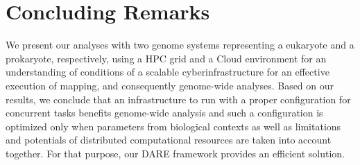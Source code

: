 \documentclass[12pt]{article}
\begin{document}
\section{Concluding Remarks}
We present our analyses with two genome systems representing a eukaryote and a prokaryote, respectively, using
 a HPC grid and a Cloud environment for an understanding of conditions of a scalable cyberinfrastructure for an effective execution of
 mapping, and consequently genome-wide analyses.   Based on our results, we conclude that an infrastructure to run with a proper configuration for concurrent tasks benefits genome-wide analysis and such a configuration is optimized only when parameters from biological contexts as well as limitations and potentials of distributed computational resources are taken into account together.  For that purpose, our DARE framework provides an efficient solution.  





\end{document}
